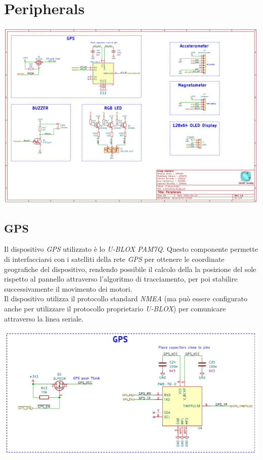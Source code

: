 \hypertarget{peripherals}{%
\section{Peripherals}\label{peripherals}}

\begin{center}
\includegraphics[scale=0.5]{figures/image15.png}
\captionsetup{type=figure}
\end{center}

\hypertarget{gps}{%
\subsection{\texorpdfstring{GPS}{GPS}}\label{gps}}

Il dispositivo \emph{GPS} utilizzato è lo \emph{U-BLOX PAM7Q}. Questo
componente permette di interfacciarsi con i satelliti della rete \emph{GPS}
per ottenere le coordinate geografiche del dispositivo, rendendo possibile 
il calcolo della la posizione del sole rispetto al
pannello attraverso l'algoritmo di tracciamento, per poi
stabilire successivamente il movimento dei motori.\\
Il dispositivo utilizza il protocollo standard \emph{NMEA} (ma può
essere configurato anche per utilizzare il protocollo proprietario
\emph{U-BLOX}) per comunicare attraverso la linea seriale.

\begin{center}
\includegraphics[scale=0.5]{figures/image26.png}
\captionsetup{type=figure}
\end{center}

